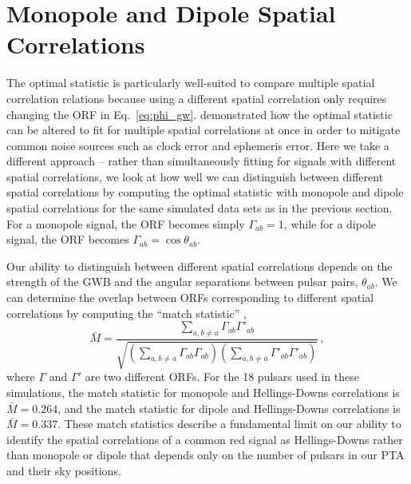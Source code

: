 \documentclass[twocolumn,aps,prd,superscriptaddress]{revtex4-1}
\begin{document}
\section{Monopole and Dipole Spatial Correlations}
\label{sec:spatial}

The optimal statistic is particularly well-suited 
to compare multiple spatial correlation relations 
because using a different spatial correlation only requires changing the ORF 
in Eq.~\eqref{eq:phi_gw}. 
\citet{thk+2016} demonstrated how the optimal statistic can be altered to fit for 
multiple spatial correlations at once in order to mitigate common noise sources such as 
clock error and ephemeris error. 
Here we take a different approach -- rather than simultaneously fitting 
for signals with different spatial correlations, 
we look at how well we can distinguish between different spatial correlations 
by computing the optimal statistic with monopole and dipole spatial correlations 
for the same simulated data sets as in the previous section. 
For a monopole signal, the ORF becomes simply
$\Gamma_{ab} = 1$, 
while for a dipole signal, the ORF becomes
$\Gamma_{ab} = \cos\theta_{ab}$.

Our ability to distinguish between different spatial correlations 
depends on the strength of the GWB 
and the angular separations between pulsar pairs, $\theta_{ab}$. 
We can determine the overlap between ORFs corresponding to different spatial correlations 
by computing the ``match statistic'' \citep{cs2016},
\begin{equation}
	\bar{M} = \frac{\sum_{a,b \neq a} \Gamma_{ab} \Gamma'_{ab}}{\sqrt{ \left( \sum_{a, b \neq a} \Gamma_{ab} \Gamma_{ab} \right) \left( \sum_{a, b \neq a} \Gamma'_{ab} \Gamma'_{ab} \right)}} \,,
\end{equation}
where $\Gamma$ and $\Gamma'$ are two different ORFs. 
For the 18 pulsars used in these simulations, the 
match statistic for monopole and Hellings-Downs correlations is $\bar{M} = 0.264$, 
and the match statistic for dipole and Hellings-Downs correlations is $\bar{M} = 0.337$. 
These match statistics describe a fundamental limit on our ability 
to identify the spatial correlations of a common red signal as Hellings-Downs 
rather than monopole or dipole 
that depends only on the number of pulsars in our PTA and their sky positions.
\end{document}
